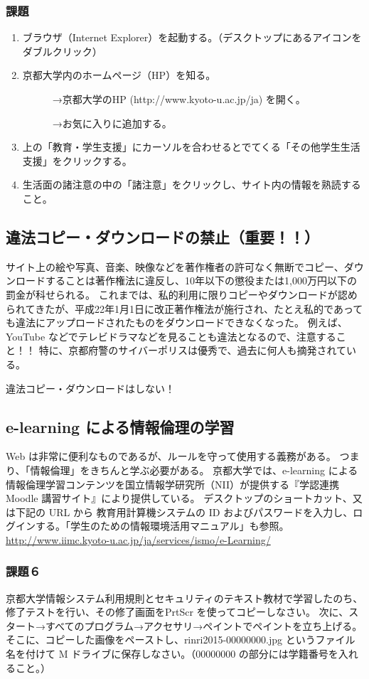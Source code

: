 \subsubsection{課題}
\begin{enumerate}
\item ブラウザ（Internet Explorer）を起動する。（デスクトップにあるアイコンをダブルクリック）
\item 京都大学内のホームページ（HP）を知る。

　　　→京都大学のHP (http://www.kyoto-u.ac.jp/ja) を開く。

　　　→お気に入りに追加する。
\item 上の「教育・学生支援」にカーソルを合わせるとでてくる「その他学生生活支援」をクリックする。
\item 生活面の諸注意の中の「諸注意」をクリックし、サイト内の情報を熟読すること。
\end{enumerate}

\subsection{違法コピー・ダウンロードの禁止（重要！！）}
サイト上の絵や写真、音楽、映像などを著作権者の許可なく無断でコピー、ダウンロードすることは著作権法に違反し、10年以下の懲役または1,000万円以下の罰金が科せられる。
これまでは、私的利用に限りコピーやダウンロードが認められてきたが、平成22年1月1日に改正著作権法が施行され、たとえ私的であっても違法にアップロードされたものをダウンロードできなくなった。
例えば、YouTube などでテレビドラマなどを見ることも違法となるので、注意すること！！
特に、京都府警のサイバーポリスは優秀で、過去に何人も摘発されている。

違法コピー・ダウンロードはしない！

\subsection{e-learning による情報倫理の学習}
Web は非常に便利なものであるが、ルールを守って使用する義務がある。
つまり、「情報倫理」をきちんと学ぶ必要がある。
京都大学では、e-learning による情報倫理学習コンテンツを国立情報学研究所（NII）が提供する『学認連携 Moodle 講習サイト』により提供している。
デスクトップのショートカット、又は下記の URL から 教育用計算機システムの ID およびパスワードを入力し、ログインする。「学生のための情報環境活用マニュアル」も参照。
\url{http://www.iimc.kyoto-u.ac.jp/ja/services/ismo/e-Learning/}

\subsubsection{課題６}
京都大学情報システム利用規則とセキュリティのテキスト教材で学習したのち、修了テストを行い、その修了画面をPrtScr を使ってコピーしなさい。
次に、スタート→すべてのプログラム→アクセサリ→ペイントでペイントを立ち上げる。
そこに、コピーした画像をペーストし、rinri2015-00000000.jpg というファイル名を付けて M ドライブに保存しなさい。（00000000 の部分には学籍番号を入れること。）

